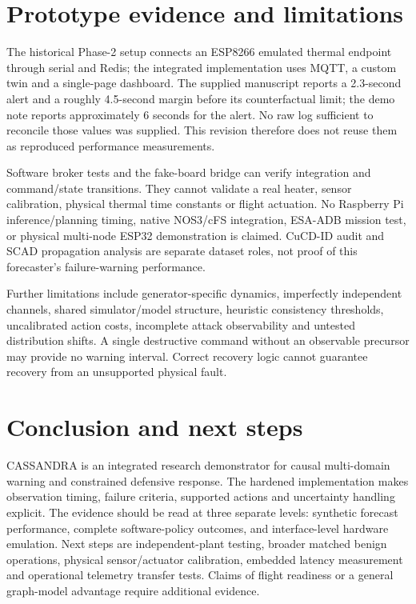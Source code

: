 \documentclass[10pt,a4paper,twocolumn]{article}
\begin{document}
\section{Prototype evidence and limitations}
The historical Phase-2 setup connects an ESP8266 emulated thermal endpoint through serial and Redis; the integrated implementation uses MQTT, a custom twin and a single-page dashboard. The supplied manuscript reports a 2.3-second alert and a roughly 4.5-second margin before its counterfactual limit; the demo note reports approximately 6 seconds for the alert. No raw log sufficient to reconcile those values was supplied. This revision therefore does not reuse them as reproduced performance measurements.

Software broker tests and the fake-board bridge can verify integration and command/state transitions. They cannot validate a real heater, sensor calibration, physical thermal time constants or flight actuation. No Raspberry Pi inference/planning timing, native NOS3/cFS integration, ESA-ADB mission test, or physical multi-node ESP32 demonstration is claimed. CuCD-ID audit and SCAD propagation analysis are separate dataset roles, not proof of this forecaster's failure-warning performance.

Further limitations include generator-specific dynamics, imperfectly independent channels, shared simulator/model structure, heuristic consistency thresholds, uncalibrated action costs, incomplete attack observability and untested distribution shifts. A single destructive command without an observable precursor may provide no warning interval. Correct recovery logic cannot guarantee recovery from an unsupported physical fault.

\section{Conclusion and next steps}
CASSANDRA is an integrated research demonstrator for causal multi-domain warning and constrained defensive response. The hardened implementation makes observation timing, failure criteria, supported actions and uncertainty handling explicit. The evidence should be read at three separate levels: synthetic forecast performance, complete software-policy outcomes, and interface-level hardware emulation. Next steps are independent-plant testing, broader matched benign operations, physical sensor/actuator calibration, embedded latency measurement and operational telemetry transfer tests. Claims of flight readiness or a general graph-model advantage require additional evidence.
\end{document}
